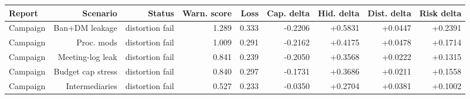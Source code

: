 \begingroup
\begin{center}
\begin{minipage}{\textwidth}
\centering
\scriptsize
\setlength{\tabcolsep}{1.5pt}
\begin{tabular*}{\textwidth}{@{\extracolsep{\fill}}lrrrrrrrr@{}}
\toprule
Report & Scenario & Status & Warn. score & Loss & Cap. delta & Hid. delta & Dist. delta & Risk delta \\
\midrule
Campaign & Ban+DM leakage & distortion fail & 1.289 & 0.333 & -0.2206 & +0.5831 & +0.0447 & +0.2391 \\
Campaign & Proc. mods & distortion fail & 1.009 & 0.291 & -0.2162 & +0.4175 & +0.0478 & +0.1714 \\
Campaign & Meeting-log leak & distortion fail & 0.841 & 0.239 & -0.2050 & +0.3568 & +0.0222 & +0.1315 \\
Campaign & Budget cap stress & distortion fail & 0.840 & 0.297 & -0.1731 & +0.3686 & +0.0211 & +0.1558 \\
Campaign & Intermediaries & distortion fail & 0.527 & 0.233 & -0.0350 & +0.2704 & +0.0381 & +0.1002 \\
\bottomrule
\end{tabular*}
\par\smallskip
\captionsetup{hypcap=false}
\label{tab:apparent-failures}
\end{minipage}
\end{center}
\endgroup
